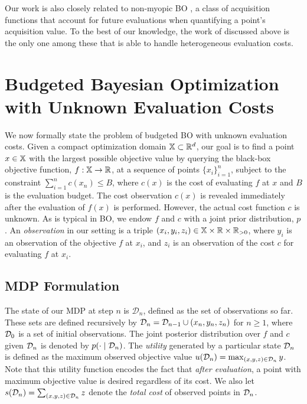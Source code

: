 Our work is also closely related to non-myopic BO \citep{gonzalez2016glasses, lam2016bayesian, yue2020non, jiang2020binoculars, lee2020efficient, jiang2020efficient,lee2021}, a class of acquisition functions that account for future evaluations when quantifying a point's acquisition value. To the best of our knowledge, the work of \cite{lee2021} discussed above is the only one among these that is able to handle heterogeneous evaluation costs.


\section{Budgeted Bayesian Optimization with Unknown Evaluation Costs}
\label{sec:problem}
We now formally state the problem of budgeted BO with unknown evaluation costs. Given a compact optimization domain $\mathbb{X}\subset\mathbb{R}^d$, our goal is to find a point $x\in\mathbb{X}$ with the largest possible objective value by querying the black-box objective function, $f:\mathbb{X} \rightarrow \mathbb{R}$, at a sequence of points $\{x_i\}_{i=1}^n$, subject to the constraint $\sum_{i=1}^n c(x_n)\leq B$, where $c(x)$ is the cost of evaluating $f$ at $x$ and $B$ is the evaluation budget. The cost observation $c(x)$ is revealed immediately after the evaluation of $f(x)$ is performed. However, the actual cost function $c$ is unknown. 
As is typical in BO, we endow $f$ and $c$ with a joint prior distribution, $p$. An \emph{observation} in our setting is a triple $(x_i, y_i, z_i) \in \mathbb{X}\times\mathbb{R}\times \mathbb{R}_{>0}$, where $y_i$ is an observation of the objective $f$ at $x_i$, and $z_i$ is an observation of the cost $c$ for evaluating $f$ at $x_i$.

\subsection{MDP Formulation}
 The state of our MDP at step $n$ is $\mathcal D_n$, defined as the set of observations so far. These sets are defined recursively by $\mathcal{D}_n = \mathcal{D}_{n-1}\cup {(x_n, y_n, z_n)}$ for $n\ge 1$, where $\mathcal{D}_0$ is a set of initial observations. The joint posterior distribution over $f$ and $c$ given $\mathcal{D}_n$ is denoted by $p(\cdot\mid \mathcal{D}_n)$. The \emph{utility} generated by a particular state $\mathcal{D}_n$ is defined as the maximum observed objective value $u(\mathcal{D}_n) = \textstyle \max_{(x,y,z) \in \mathcal{D}_n} y$. Note that this utility function encodes the fact that \emph{after evaluation}, a point with maximum objective value is desired regardless of its cost. We also let $s(\mathcal{D}_n) = \textstyle \sum_{(x,y,z) \in \mathcal{D}_n} z$ denote the \emph{total cost} of observed points in $\mathcal{D}_n$.

